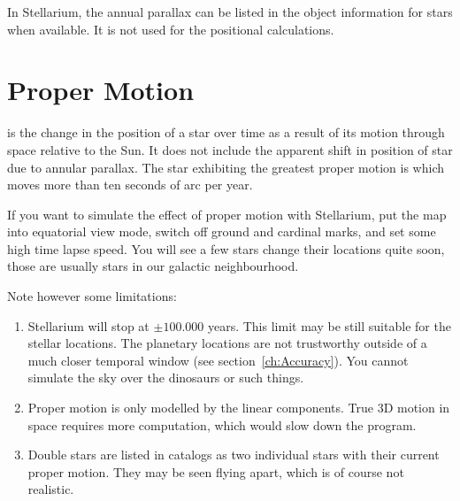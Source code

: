 In Stellarium, the annual parallax can be listed in the object information for stars
when available. It is not used for the positional calculations.

\section{Proper Motion}
\label{sec:Concepts:ProperMotion}

 is the change in the position of a star over time as a
result of its motion through space relative to the Sun. It does not
include the apparent shift in position of star due to annular parallax.
The star exhibiting the greatest proper motion is  which
moves more than ten seconds of arc per year.

If you want to simulate the effect of proper motion with Stellarium,
put the map into equatorial view mode, switch off ground and cardinal
marks, and set some high time lapse speed. You will see a few stars
change their locations quite soon, those are usually stars in our
galactic neighbourhood.

Note however some limitations:
\begin{enumerate}
\item Stellarium will stop at $\pm 100.000$ years. This limit may be
  still suitable for the stellar locations. The planetary locations
  are not trustworthy outside of a much closer temporal window (see
  section~\ref{ch:Accuracy}). You cannot simulate the sky over the
  dinosaurs or such things.
\item Proper motion is only modelled by the linear components. True 3D
  motion in space requires more computation, which would slow down the
  program.
\item Double stars are listed in catalogs as two individual stars with
  their current proper motion. They may be seen flying apart, which is
  of course not realistic.
\end{enumerate}

